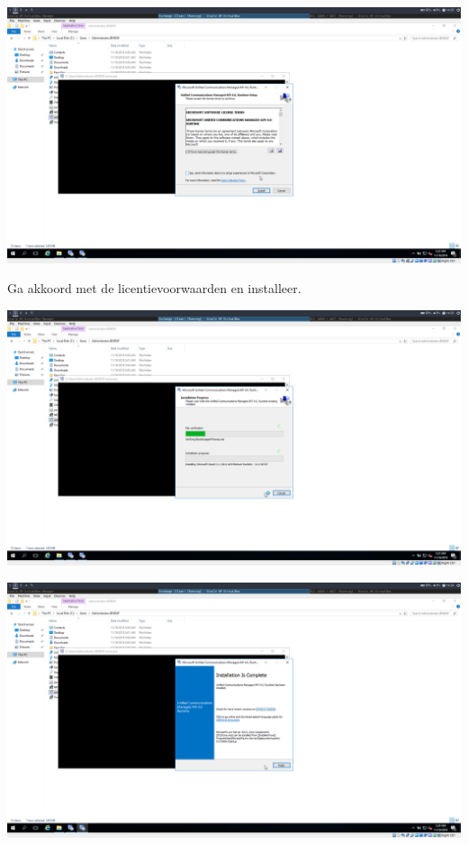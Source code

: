 \documentclass[a4paper]{article}
\begin{document}
	\begin{center}
	\includegraphics[width=15cm]{Pictures/Exchange/Pre/1542633813.png}
	
	Ga akkoord met de licentievoorwaarden en installeer.
\end{center}
	\begin{center}
	\includegraphics[width=15cm]{Pictures/Exchange/Pre/1542633816.png}
\end{center}
	\begin{center}
	\includegraphics[width=15cm]{Pictures/Exchange/Pre/1542633844.png}
\end{center}
\end{document}
